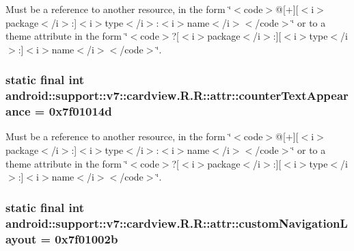 Must be a reference to another resource, in the form \char`\"{}$<$code$>$@\mbox{[}+\mbox{]}\mbox{[}$<$i$>$package$<$/i$>$:\mbox{]}$<$i$>$type$<$/i$>$:$<$i$>$name$<$/i$>$$<$/code$>$\char`\"{} or to a theme attribute in the form \char`\"{}$<$code$>$?\mbox{[}$<$i$>$package$<$/i$>$:\mbox{]}\mbox{[}$<$i$>$type$<$/i$>$:\mbox{]}$<$i$>$name$<$/i$>$$<$/code$>$\char`\"{}. \hypertarget{classandroid_1_1support_1_1v7_1_1cardview_1_1_r_1_1attr_ceb3035cb8b908d8d59cf468fc521fff}{
\subsubsection[{counterTextAppearance}]{\setlength{\rightskip}{0pt plus 5cm}static final int android::support::v7::cardview.R.R::attr::counterTextAppearance = 0x7f01014d}}
\label{classandroid_1_1support_1_1v7_1_1cardview_1_1_r_1_1attr_ceb3035cb8b908d8d59cf468fc521fff}


Must be a reference to another resource, in the form \char`\"{}$<$code$>$@\mbox{[}+\mbox{]}\mbox{[}$<$i$>$package$<$/i$>$:\mbox{]}$<$i$>$type$<$/i$>$:$<$i$>$name$<$/i$>$$<$/code$>$\char`\"{} or to a theme attribute in the form \char`\"{}$<$code$>$?\mbox{[}$<$i$>$package$<$/i$>$:\mbox{]}\mbox{[}$<$i$>$type$<$/i$>$:\mbox{]}$<$i$>$name$<$/i$>$$<$/code$>$\char`\"{}. \hypertarget{classandroid_1_1support_1_1v7_1_1cardview_1_1_r_1_1attr_ae10e3832af77e4ab3a5337cb4945501}{
\subsubsection[{customNavigationLayout}]{\setlength{\rightskip}{0pt plus 5cm}static final int android::support::v7::cardview.R.R::attr::customNavigationLayout = 0x7f01002b}}
\label{classandroid_1_1support_1_1v7_1_1cardview_1_1_r_1_1attr_ae10e3832af77e4ab3a5337cb4945501}


